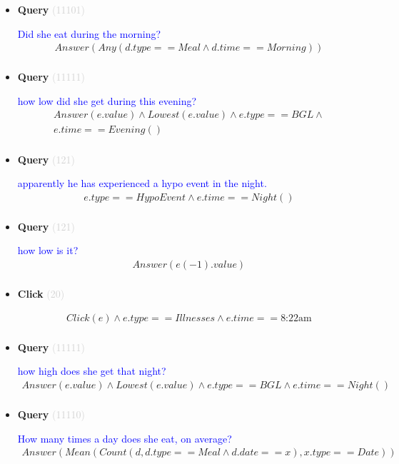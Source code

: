 \documentclass[11pt]{article}
\newcommand{\key}[1]{\textcolor{lightgray}{#1}}
\newcounter{CQuery}
\newcounter{CClick}
\begin{document}
\begin{itemize}
\item
\textbf{Query\theCQuery} \key{(11101)} \addtocounter{CQuery}{1}
\textcolor{blue}{ Did she eat during the morning? }
\begin{multline*}
Answer(Any(d.type==Meal \wedge d.time==Morning)) \\ 
\end{multline*}


\item
\textbf{Query\theCQuery} \key{(11111)} \addtocounter{CQuery}{1}
\textcolor{blue}{ how low did she get during this evening? }
\begin{multline*}
Answer(e.value) \wedge Lowest(e.value) \wedge e.type==BGL \wedge \\ 
e.time==Evening() \\ 
\end{multline*}


\item
\textbf{Query\theCQuery} \key{(121)} \addtocounter{CQuery}{1}
\textcolor{blue}{ apparently he has experienced a hypo event in the night. }
\begin{multline*}
e.type==HypoEvent \wedge e.time==Night() \\ 
\end{multline*}


\item
\textbf{Query\theCQuery} \key{(121)} \addtocounter{CQuery}{1}
\textcolor{blue}{ how low is it? }
\begin{multline*}
Answer(e(-1).value) \\ 
\end{multline*}


\item
\textbf{Click\theCClick} \key{(20)} \addtocounter{CClick}{1}
\textcolor{blue}{  }
\begin{multline*}
Click(e) \wedge e.type==Illnesses \wedge e.time==\mbox{8:22am} \\ 
\end{multline*}


\item
\textbf{Query\theCQuery} \key{(11111)} \addtocounter{CQuery}{1}
\textcolor{blue}{ how high does she get that night? }
\begin{multline*}
Answer(e.value) \wedge Lowest(e.value) \wedge e.type==BGL \wedge e.time==Night() \\ 
\end{multline*}


\item
\textbf{Query\theCQuery} \key{(11110)} \addtocounter{CQuery}{1}
\textcolor{blue}{ How many times a day does she eat, on average? }
\begin{multline*}
Answer(Mean(Count(d, d.type==Meal \wedge d.date==x), x.type==Date)) \\ 
\end{multline*}



\end{itemize}
\end{document}
